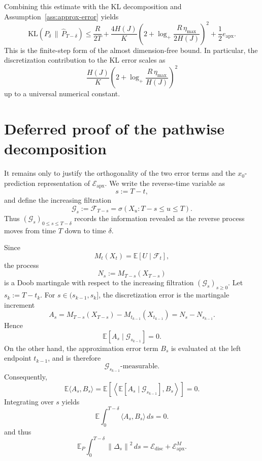 \documentclass[11pt]{article}
\newcommand{\E}{\mathbb{E}}
\newcommand{\KL}{\mathrm{KL}}
\newcommand{\norm}[1]{\left\lVert #1 \right\rVert}
\begin{document}
Combining this estimate with the KL decomposition and Assumption~\ref{ass:approx-error} yields
\[
    \KL(P_\delta\,\|\,\widehat P_{T-\delta})
    \le
    \frac{R}{2T}
    +
    \frac{4H(J)}{K}
    \left(
    2+\log_+\frac{R\,\eta_{\max}}{2H(J)}
    \right)^2
    +
    \frac12 e_{\mathrm{apx}} .
\]
This is the finite-step form of the almost dimension-free bound. In particular, the discretization contribution to the KL error scales as
\[
    \frac{H(J)}{K}
    \left(
    2+\log_+\frac{R\,\eta_{\max}}{H(J)}
    \right)^2
\]
up to a universal numerical constant.


\section{Deferred proof of the pathwise decomposition}
\label{app:pathwise-kl}

It remains only to justify the orthogonality of the two error terms and the
\(x_0\)-prediction representation of \(\mathcal E_{\mathrm{apx}}\). We write
the reverse-time variable as
\[
    s:=T-t,
\]
and define the increasing filtration
\[
    \mathcal G_s
    :=
    \mathcal F_{T-s}
    =
    \sigma(X_u:T-s\le u\le T).
\]
Thus \((\mathcal G_s)_{0\le s\le T-\delta}\) records the information revealed
as the reverse process moves from time \(T\) down to time \(\delta\).

Since
\[
    M_t(X_t)=\E[U\mid \mathcal F_t],
\]
the process
\[
    N_s:=M_{T-s}(X_{T-s})
\]
is a Doob martingale with respect to the increasing filtration
\((\mathcal G_s)_{s\ge0}\). Let \(s_k:=T-t_k\). For
\(s\in(s_{k-1},s_k]\), the discretization error is the martingale increment
\[
    A_s
    =
    M_{T-s}(X_{T-s})-M_{t_{k-1}}(X_{t_{k-1}})
    =
    N_s-N_{s_{k-1}} .
\]
Hence
\[
    \E[A_s\mid \mathcal G_{s_{k-1}}]=0.
\]
On the other hand, the approximation error term \(B_s\) is evaluated at the
left endpoint \(t_{k-1}\), and is therefore
\[
    \mathcal G_{s_{k-1}}\text{-measurable}.
\]
Consequently,
\[
    \E\langle A_s,B_s\rangle
    =
    \E\left[
        \left\langle
            \E[A_s\mid \mathcal G_{s_{k-1}}],
            B_s
        \right\rangle
    \right]
    =
    0.
\]
Integrating over \(s\) yields
\[
    \E\int_0^{T-\delta}\langle A_s,B_s\rangle\,ds=0.
\]
and thus
\[
    \E_P\int_0^{T-\delta}\norm{\Delta_s}^2\,ds
    =
    \mathcal E_{\mathrm{disc}}+\mathcal E_{\mathrm{apx}}^{M}.
\]
\end{document}
